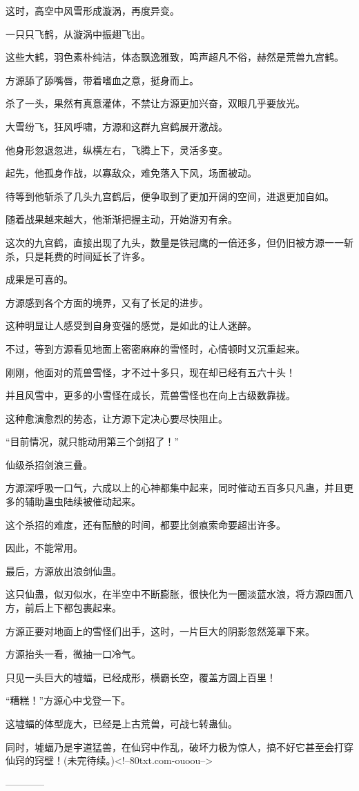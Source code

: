 \begin{this_body}
这时，高空中风雪形成漩涡，再度异变。

一只只飞鹤，从漩涡中振翅飞出。

这些大鹤，羽色素朴纯洁，体态飘逸雅致，鸣声超凡不俗，赫然是荒兽九宫鹤。

方源舔了舔嘴唇，带着嗜血之意，挺身而上。

杀了一头，果然有真意灌体，不禁让方源更加兴奋，双眼几乎要放光。

大雪纷飞，狂风呼啸，方源和这群九宫鹤展开激战。

他身形忽退忽进，纵横左右，飞腾上下，灵活多变。

起先，他孤身作战，以寡敌众，难免落入下风，场面被动。

待等到他斩杀了几头九宫鹤后，便争取到了更加开阔的空间，进退更加自如。

随着战果越来越大，他渐渐把握主动，开始游刃有余。

这次的九宫鹤，直接出现了九头，数量是铁冠鹰的一倍还多，但仍旧被方源一一斩杀，只是耗费的时间延长了许多。

成果是可喜的。

方源感到各个方面的境界，又有了长足的进步。

这种明显让人感受到自身变强的感觉，是如此的让人迷醉。

不过，等到方源看见地面上密密麻麻的雪怪时，心情顿时又沉重起来。

刚刚，他面对的荒兽雪怪，才不过十多只，现在却已经有五六十头！

并且风雪中，更多的小雪怪在成长，荒兽雪怪也在向上古级数靠拢。

这种愈演愈烈的势态，让方源下定决心要尽快阻止。

“目前情况，就只能动用第三个剑招了！”

仙级杀招剑浪三叠。

方源深呼吸一口气，六成以上的心神都集中起来，同时催动五百多只凡蛊，并且更多的辅助蛊虫陆续被催动起来。

这个杀招的难度，还有酝酿的时间，都要比剑痕索命要超出许多。

因此，不能常用。

最后，方源放出浪剑仙蛊。

这只仙蛊，似刃似水，在半空中不断膨胀，很快化为一圈淡蓝水浪，将方源四面八方，前后上下都包裹起来。

方源正要对地面上的雪怪们出手，这时，一片巨大的阴影忽然笼罩下来。

方源抬头一看，微抽一口冷气。

只见一头巨大的墟蝠，已经成形，横霸长空，覆盖方圆上百里！

“糟糕！”方源心中戈登一下。

这墟蝠的体型庞大，已经是上古荒兽，可战七转蛊仙。

同时，墟蝠乃是宇道猛兽，在仙窍中作乱，破坏力极为惊人，搞不好它甚至会打穿仙窍的窍壁！(未完待续。)<!--80txt.com-ouoou-->

------------

\end{this_body}

